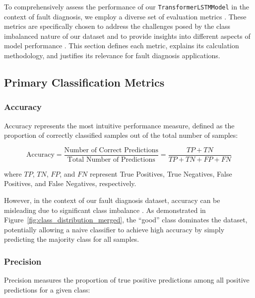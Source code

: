 To comprehensively assess the performance of our \texttt{TransformerLSTMModel} in the context of fault diagnosis, we employ a diverse set of evaluation metrics \citep{hastie2009elements, he2009learning}. These metrics are specifically chosen to address the challenges posed by the class imbalanced nature of our dataset and to provide insights into different aspects of model performance \citep{krawczyk2016learning, chawla2002smote}. This section defines each metric, explains its calculation methodology, and justifies its relevance for fault diagnosis applications.

\subsection{Primary Classification Metrics}
\label{subsec:primary_metrics}

\subsubsection{Accuracy}
\label{subsubsec:accuracy}

Accuracy represents the most intuitive performance measure, defined as the proportion of correctly classified samples out of the total number of samples:

\begin{equation}
\text{Accuracy} = \frac{\text{Number of Correct Predictions}}{\text{Total Number of Predictions}} = \frac{TP + TN}{TP + TN + FP + FN}
\end{equation}

where $TP$, $TN$, $FP$, and $FN$ represent True Positives, True Negatives, False Positives, and False Negatives, respectively.

However, in the context of our fault diagnosis dataset, accuracy can be misleading due to significant class imbalance \citep{he2009learning, krawczyk2016learning}. As demonstrated in Figure~\ref{fig:class_distribution_merged}, the ``good'' class dominates the dataset, potentially allowing a naive classifier to achieve high accuracy by simply predicting the majority class for all samples.

\subsubsection{Precision}
\label{subsubsec:precision}

Precision measures the proportion of true positive predictions among all positive predictions for a given class:

